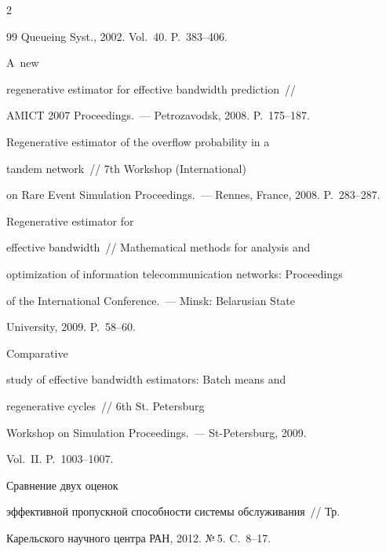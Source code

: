 \begin{multicols}{2}
{{\begin{thebibliography}{99}
Queueing Syst., 2002. Vol.~40. P.~383--406.




 A~new

regenerative estimator for effective bandwidth prediction~// 

AMICT 2007 Proceedings.~--- Petrozavodsk, 2008. P.~175--187.




  Regenerative estimator of the overflow probability in a

 tandem network~// 7th  Workshop (International)

 on Rare Event Simulation Proceedings.~---  Rennes, France, 2008. P.~283--287.




  Regenerative estimator for

effective bandwidth~// Mathematical  methods for analysis and

optimization of information telecommunication networks: Proceedings

of  the International Conference.~--- Minsk: Belarusian State

University, 2009. P.~58--60.




 Comparative

study of effective bandwidth estimators: Batch means and

regenerative cycles~// 6th St. Petersburg

Workshop on Simulation Proceedings.~--- St-Petersburg, 2009.

 Vol.~II. P.~1003--1007.

 


 Сравнение двух оценок

эффективной пропускной способности системы обслуживания~// Тр.

Карельского научного центра РАН, 2012. №\,5. C.~8--17.





\end{thebibliography}}}
\end{multicols}
